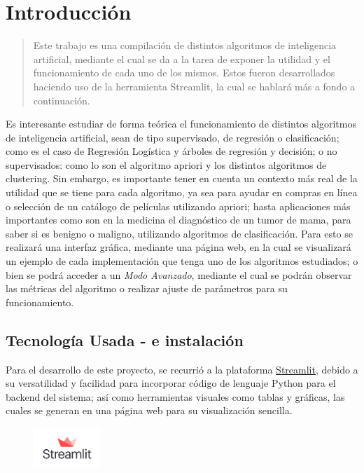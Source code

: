 \documentclass[10pt]{article}
\begin{document}
\vspace*{\baselineskip}
\tableofcontents 
\setcounter{page}{0}
\thispagestyle{empty}
\newpage


\section{Introducción}

\begin{abstract}
    Este trabajo es una compilación de distintos algoritmos de inteligencia artificial, mediante el cual se da a la tarea de exponer la utilidad y el funcionamiento de cada uno de los mismos. Estos fueron desarrollados haciendo uso de la herramienta Streamlit, la cual se hablará más a fondo a continuación.
\end{abstract}

Es interesante estudiar de forma teórica el funcionamiento de distintos algoritmos de inteligencia artificial, sean de tipo supervisado, de regresión o clasificación; como es el caso de Regresión Logística y árboles de regresión y decisión; o no supervisados: como lo son el algoritmo apriori y los distintos algoritmos de clustering. Sin embargo, es importante tener en cuenta un contexto más real de la utilidad que se tiene para cada algoritmo, ya sea para ayudar en compras en línea o selección de un catálogo de películas utilizando apriori; hasta aplicaciones más importantes como son en la medicina el diagnóstico de un tumor de mama, para saber si es benigno o maligno, utilizando algoritmos de clasificación. Para esto se realizará una interfaz gráfica, mediante una página web, en la cual se visualizará un ejemplo de cada implementación que tenga uno de los algoritmos estudiados; o bien se podrá acceder a un \textit{Modo Avanzado}, mediante el cual se podrán observar las métricas del algoritmo o realizar ajuste de parámetros para su funcionamiento.

\subsection{Tecnología Usada - e instalación}
    Para el desarrollo de este proyecto, se recurrió a la plataforma \href{https://streamlit.io/}{Streamlit}, debido a su versatilidad y facilidad para incorporar código de lenguaje Python para el backend del sistema; así como herramientas visuales como tablas y gráficas, las cuales se generan en una página web para su visualización sencilla.
    
    \begin{figure}[ht!]
    \centering
    \includegraphics[height= 1.5cm]{img/streamlit.png}
    \label{fig:StreamlitLogo}
    \end{figure}
    
\end{document}
